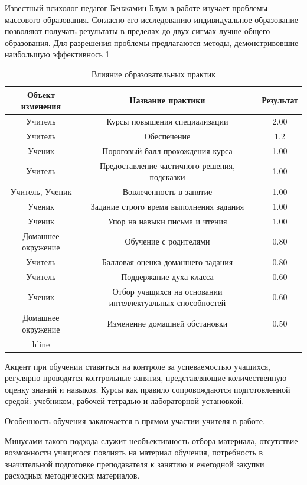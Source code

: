 Известный психолог педагог Бенжамин Блум в работе \cite{bloom1984} изучает проблемы массового образования.
Согласно его исследованию индивидуальное образование позволяют получать 
результаты в пределах до двух сигмах лучше общего образования. Для разрешения проблемы
предлагаются методы, демонстривовшие наибольшую эффективнось \ref{bloom_table}

\begin{table}
    \begin{tabular}{|c |c| c |}
        Объект изменения &	Название практики &  Результат\\
        \hline
        Учитель & Курсы повышения специализации &	2.00 \\	
        Учитель	& Обеспечение	& 1.2	\\	 
        Ученик	& Пороговый балл прохождения курса & 1.00	\\	
        Учитель	& Предоставление частичного решения, подсказки	& 1.00	\\	
        Учитель, Ученик	& Вовлеченность в занятие & 1.00	\\	
        Ученик	& Задание строго время выполнения задания &	1.00	\\
        Ученик & Упор на навыки письма и чтения & 	1.00	\\
        Домашнее окружение & Обучение с родителями &	0.80 \\	
        Учитель	& Балловая оценка домашнего задания	&0.80	\\
        Учитель	& Поддержание духа класса &	0.60	\\
        Ученик	& Отбор учащихся на основании интеллектуальных способностей	 &0.60	\\
        Домашнее окружение & Изменение домашней обстановки & 0.50 \\
        hline	
    \end{tabular}
    \caption{Влияние образовательных практик }
    \label{bloom_table}
\end{table}


Акцент при обучении ставиться на контроле за успеваемостью учащихся, 
регулярно проводятся контрольные занятия, представляющие количественную оценку знаний и навыков.
Курсы как правило сопровождаются подготовленной средой: учебником, рабочей тетрадью и лабораторной установкой.

Особенность обучения заключается в прямом участии учителя в работе.

Минусами такого подхода служит необъективность отбора материала,
отсутствие возможности учащегося повлиять на материал обучения, 
потребность в значительной подготовке преподавателя к занятию и ежегодной закупки расходных методических материалов.

